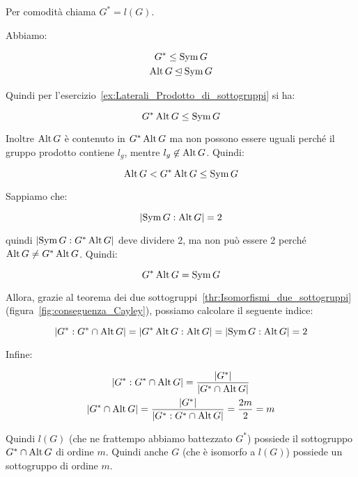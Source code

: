 \begin{dimostrazione}
	Per comodità chiama $G^* = l(G)$.
	
	Abbiamo:
	
	\begin{gather}
		G^* \le \operatorname{Sym} G \\
		\operatorname{Alt} G \unlhd \operatorname{Sym} G
	\end{gather}

	Quindi per l'esercizio~\ref{ex:Laterali_Prodotto_di_sottogruppi} si ha:
	
	\begin{equation}
		G^* \operatorname{Alt} G \le \operatorname{Sym} G
	\end{equation}
	
	Inoltre $\operatorname{Alt} G$ è contenuto in $G^* \operatorname{Alt} G$ ma non possono essere uguali perché il gruppo prodotto contiene $l_g$, mentre  $l_g \not\in \operatorname{Alt} G$. Quindi:
	
	\begin{equation}
		\operatorname{Alt} G < G^* \operatorname{Alt} G \le \operatorname{Sym} G
	\end{equation}

	Sappiamo che:
	
	\begin{equation}
		\lvert \operatorname{Sym} G:\operatorname{Alt} G \rvert = 2
	\end{equation}

	quindi $\lvert \operatorname{Sym} G:G^* \operatorname{Alt} G \rvert$ deve dividere 2, ma non può essere 2 perché $\operatorname{Alt} G \ne G^* \operatorname{Alt} G$. Quindi:
	
	\begin{equation}
		G^* \operatorname{Alt} G = \operatorname{Sym} G
	\end{equation}

	Allora, grazie al teorema dei due sottogruppi~\ref{thr:Isomorfismi_due_sottogruppi} (figura~\ref{fig:conseguenza_Cayley}), possiamo calcolare il seguente indice:
	
	\begin{equation}
		\lvert G^*:G^* \cap \operatorname{Alt} G \rvert = \lvert G^* \operatorname{Alt} G:\operatorname{Alt} G \rvert = \lvert \operatorname{Sym} G:\operatorname{Alt} G \rvert = 2
	\end{equation}
	
	Infine:
	
	\begin{gather}
		\lvert G^*:G^* \cap \operatorname{Alt} G \rvert = \dfrac{\lvert G^* \rvert}{\lvert G^* \cap \operatorname{Alt} G \rvert} \\
		\lvert G^* \cap \operatorname{Alt} G \rvert = \dfrac{\lvert G^* \rvert}{\lvert G^*:G^* \cap \operatorname{Alt} G \rvert} =
		\dfrac{2m}{2} = m
	\end{gather}
	
	Quindi $l(G)$ (che ne frattempo abbiamo battezzato $G^*$) possiede il sottogruppo $G^* \cap \operatorname{Alt} G$ di ordine $m$. Quindi anche $G$ (che è isomorfo a $l(G)$) possiede un sottogruppo di ordine $m$.
	
\end{dimostrazione}
